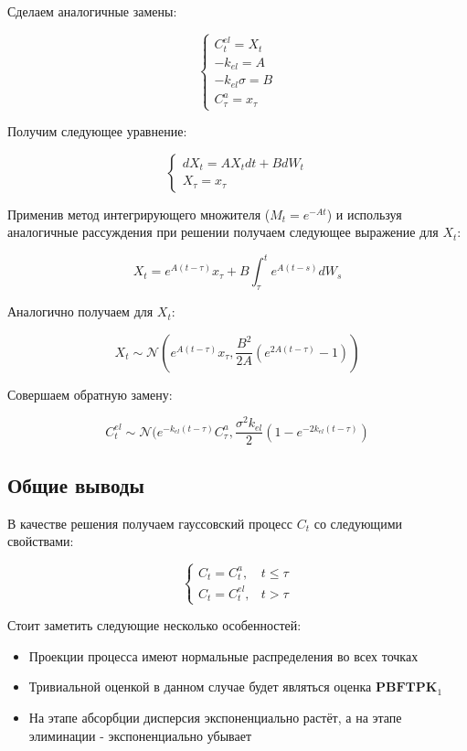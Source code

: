 \documentclass[oneside,senior,etd]{BYUPhys}
\begin{document}
Сделаем аналогичные замены:

\[
	\begin{cases}
		C_t^{el} = X_t     \\
		-k_{el} = A        \\
		-k_{el} \sigma = B \\
		C_{\tau}^a = x_{\tau}
	\end{cases}
\]

Получим следующее уравнение:

\[
	\begin{cases}
		dX_t = A X_t dt + B dW_t \\
		X_{\tau} = x_{\tau}
	\end{cases}
\]

Применив метод интегрирующего множителя ($M_t = e^{-At}$) и используя аналогичные рассуждения при решении получаем следующее выражение для $X_t$:

\[
	X_t = e^{A(t - \tau)} x_{\tau} + B \int_{\tau}^{t} e^{A(t - s)} dW_s
\]

Аналогично получаем для $X_t$:

\[
	X_t \sim \mathcal{N}(e^{A(t - \tau)} x_{\tau} , \frac{B^2}{2A}(e^{2A(t - \tau)} - 1))
\]

Совершаем обратную замену:

\[
	C_t^{el} \sim \mathcal{N}(e^{-k_{el}(t - \tau)} C_{\tau}^a , \frac{\sigma^2 k_{el}}{2}(1 - e^{-2k_{el}(t - \tau)})
\]

\subsection{Общие выводы}

В качестве решения получаем гауссовский процесс $C_t$ со следующими свойствами:

\[
	\begin{cases}
		C_t = C_t^a,    & t \le \tau \\
		C_t = C_t^{el}, & t > \tau
	\end{cases}
\]

Стоит заметить следующие несколько особенностей:

\begin{itemize}
	\item Проекции процесса имеют нормальные распределения во всех точках
	\item Тривиальной оценкой в данном случае будет являться оценка $\textbf{PBFTPK}_1$
	\item На этапе абсорбции дисперсия экспоненциально растёт, а на этапе элиминации - экспоненциально убывает
\end{itemize}
\end{document}
